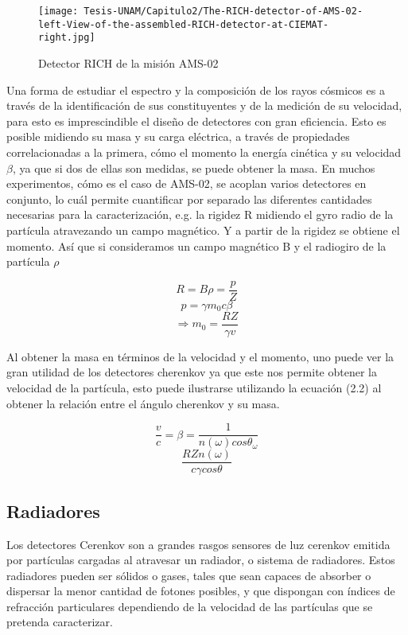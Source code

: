 

\begin{figure}
    \centering
    \texttt{[image: Tesis-UNAM/Capitulo2/The-RICH-detector-of-AMS-02-left-View-of-the-assembled-RICH-detector-at-CIEMAT-right.jpg]}
    \caption{Detector RICH de la misión AMS-02 \cite{AMSRICH}}
    \label{fig:enter-label}
\end{figure}

Una forma de estudiar el espectro y la composición de los rayos cósmicos es a través de la identificación de sus constituyentes y de la medición de su velocidad\cite{RICHCERN}, para esto es imprescindible el diseño de detectores con gran eficiencia. Esto es posible midiendo su masa y su carga eléctrica, a través de propiedades correlacionadas a la primera, cómo el momento la energía cinética y su velocidad $\beta$\cite{RICHCERN}, ya que si dos de ellas son medidas, se puede obtener la masa. En muchos experimentos, cómo es el caso de AMS-02, se acoplan varios detectores en conjunto, lo cuál permite cuantificar por separado las diferentes cantidades necesarias para la caracterización, e.g. la rigidez R midiendo el gyro radio de la partícula atravezando un campo magnético. Y a partir de la rigidez se obtiene el momento. Así que si consideramos un campo magnético B y el radiogiro de la partícula $\rho$

$$R = B\rho = \frac{p}{Z}$$
$$p = \gamma m_0c\beta$$
$$\Longrightarrow m_0 = \frac{RZ}{\gamma v}$$

Al obtener la masa en términos de la velocidad y el momento, uno puede ver la gran utilidad de los detectores cherenkov ya que este nos permite obtener la velocidad de la partícula, esto puede ilustrarse utilizando la ecuación (2.2) al obtener la relación entre el ángulo cherenkov y su masa.\cite{RICHCERN}

$$\frac{v}{c}=\beta=\frac{1}{n(\omega) cos\theta_\omega}$$
\begin{equation}
    \frac{RZn(\omega)}{c\gamma cos\theta}
\end{equation}

\subsection{Radiadores}
Los detectores Cerenkov son a grandes rasgos sensores de luz cerenkov emitida por partículas cargadas al atravesar un radiador, o sistema de radiadores. Estos radiadores pueden ser sólidos o gases\cite{RICHCERN}, tales que sean capaces de absorber o dispersar la menor cantidad de fotones posibles, y que dispongan con índices de refracción particulares dependiendo de la velocidad de las partículas que se pretenda caracterizar.\\

